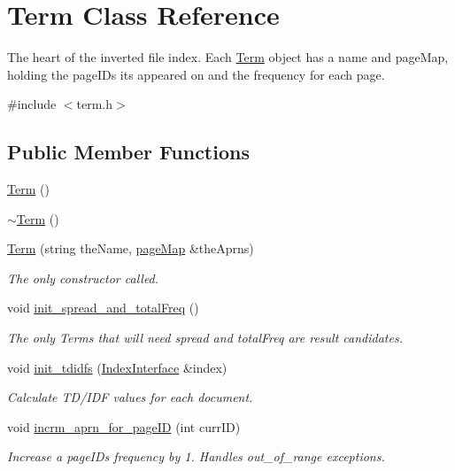 \hypertarget{class_term}{}\section{Term Class Reference}
\label{class_term}


The heart of the inverted file index. Each \hyperlink{class_term}{Term} object has a name and page\+Map, holding the page\+I\+Ds it\textquotesingle{}s appeared on and the frequency for each page.  




{\ttfamily \#include $<$term.\+h$>$}

\subsection*{Public Member Functions}
\begin{DoxyCompactItemize}
\item 
\hyperlink{class_term_a6943005db5b7e5ca84afcb54a5862d42}{Term} ()
\item 
\hyperlink{class_term_af684aafab11ec6442aed0866b4973afc}{$\sim$\+Term} ()
\item 
\hyperlink{class_term_ae97a04d16b87ac6bebe1057481f962c8}{Term} (string the\+Name, \hyperlink{avltreeinterface_8h_a51573ee2746540a219209715c54ab66c}{page\+Map} \&the\+Aprns)
\begin{DoxyCompactList}\small\item\em The only constructor called. \end{DoxyCompactList}\item 
void \hyperlink{class_term_a2cd7415c99700d9b038517207e1d2738}{init\+\_\+spread\+\_\+and\+\_\+total\+Freq} ()
\begin{DoxyCompactList}\small\item\em The only Terms that will need spread and total\+Freq are result candidates. \end{DoxyCompactList}\item 
void \hyperlink{class_term_a3a48a3273c4bb8755c4623efbf3ebf51}{init\+\_\+tdidfs} (\hyperlink{class_index_interface}{Index\+Interface} \&index)
\begin{DoxyCompactList}\small\item\em Calculate T\+D/\+I\+D\+F values for each document. \end{DoxyCompactList}\item 
void \hyperlink{class_term_a40b76759d6a08c027142527f86d85256}{incrm\+\_\+aprn\+\_\+for\+\_\+page\+I\+D} (int curr\+I\+D)
\begin{DoxyCompactList}\small\item\em Increase a page\+I\+D\textquotesingle{}s frequency by 1. Handles out\+\_\+of\+\_\+range exceptions. \end{DoxyCompactList}\item 

\end{DoxyCompactItemize}
